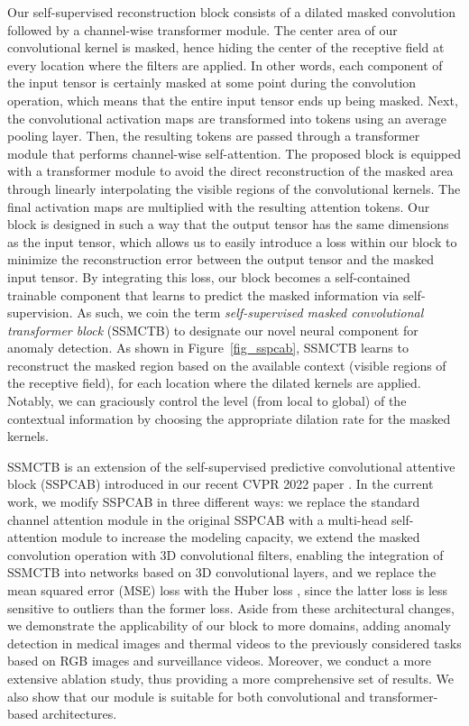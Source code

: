\documentclass[10pt,journal,compsoc]{IEEEtran}
\begin{document}
Our self-supervised reconstruction block consists of a dilated masked convolution followed by a channel-wise transformer module. The center area of our convolutional kernel is masked, hence hiding the center of the receptive field at every location where the filters are applied. In other words, each component of the input tensor is certainly masked at some point during the convolution operation, which means that the entire input tensor ends up being masked. Next, the convolutional activation maps are transformed into tokens using an average pooling layer. Then, the resulting tokens are passed through a transformer module \cite{Dosovitskiy-ICLR-2020,Vaswani-NIPS-2017} that performs channel-wise self-attention. The proposed block is equipped with a transformer module to avoid the direct reconstruction of the masked area through linearly interpolating the visible regions of the convolutional kernels. The final activation maps are multiplied with the resulting attention tokens. Our block is designed in such a way that the output tensor has the same dimensions as the input tensor, which allows us to easily introduce a loss within our block to minimize the reconstruction error between the output tensor and the masked input tensor. By integrating this loss, our block becomes a self-contained trainable component that learns to predict the masked information via self-supervision. As such, we coin the term \emph{self-supervised masked convolutional transformer block} (SSMCTB) to designate our novel neural component for anomaly detection. As shown in Figure~\ref{fig_sspcab}, SSMCTB learns to reconstruct the masked region based on the available context (visible regions of the receptive field), for each location where the dilated kernels are applied. Notably, we can graciously control the level (from local to global) of the contextual information by choosing the appropriate dilation rate for the masked kernels. 

SSMCTB is an extension of the self-supervised predictive convolutional attentive block (SSPCAB) introduced in our recent CVPR 2022 paper \cite{Ristea-CVPR-2022}. In the current work, we modify SSPCAB in three different ways:  we replace the standard channel attention module in the original SSPCAB \cite{Ristea-CVPR-2022} with a multi-head self-attention module \cite{Dosovitskiy-ICLR-2020,Vaswani-NIPS-2017} to increase the modeling capacity,  we extend the masked convolution operation with 3D convolutional filters, enabling the integration of SSMCTB into networks based on 3D convolutional layers, and  we replace the mean squared error (MSE) loss with the Huber loss \cite{Huber-AMS-1964}, since the latter loss is less sensitive to outliers than the former loss. Aside from these architectural changes, we demonstrate the applicability of our block to more domains, adding anomaly detection in medical images and thermal videos to the previously considered tasks based on RGB images and surveillance videos. Moreover, we conduct a more extensive ablation study, thus providing a more comprehensive set of results. We also show that our module is suitable for both convolutional and transformer-based architectures.
\end{document}
